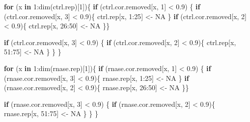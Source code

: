 \documentclass[
]{article}
\newenvironment{Shaded}{\begin{snugshade}}{\end{snugshade}}
\newcommand{\ConstantTok}[1]{\textcolor[rgb]{0.00,0.00,0.00}{#1}}
\newcommand{\ControlFlowTok}[1]{\textcolor[rgb]{0.13,0.29,0.53}{\textbf{#1}}}
\newcommand{\DecValTok}[1]{\textcolor[rgb]{0.00,0.00,0.81}{#1}}
\newcommand{\FloatTok}[1]{\textcolor[rgb]{0.00,0.00,0.81}{#1}}
\newcommand{\FunctionTok}[1]{\textcolor[rgb]{0.00,0.00,0.00}{#1}}
\newcommand{\NormalTok}[1]{#1}
\newcommand{\OtherTok}[1]{\textcolor[rgb]{0.56,0.35,0.01}{#1}}
\newcommand{\SpecialCharTok}[1]{\textcolor[rgb]{0.00,0.00,0.00}{#1}}
\begin{document}
\begin{Shaded}
\begin{Highlighting}[]
\ControlFlowTok{for}\NormalTok{ (x }\ControlFlowTok{in} \DecValTok{1}\SpecialCharTok{:}\FunctionTok{dim}\NormalTok{(ctrl.rep)[}\DecValTok{1}\NormalTok{])\{}
  \ControlFlowTok{if}\NormalTok{ (ctrl.cor.removed[x, }\DecValTok{1}\NormalTok{] }\SpecialCharTok{\textless{}} \FloatTok{0.9}\NormalTok{) \{}
    \ControlFlowTok{if}\NormalTok{ (ctrl.cor.removed[x, }\DecValTok{3}\NormalTok{] }\SpecialCharTok{\textless{}} \FloatTok{0.9}\NormalTok{)\{}
\NormalTok{      ctrl.rep[x, }\DecValTok{1}\SpecialCharTok{:}\DecValTok{25}\NormalTok{] }\OtherTok{\textless{}{-}} \ConstantTok{NA} 
\NormalTok{    \}}
    \ControlFlowTok{if}\NormalTok{ (ctrl.cor.removed[x, }\DecValTok{2}\NormalTok{] }\SpecialCharTok{\textless{}} \FloatTok{0.9}\NormalTok{)\{}
\NormalTok{      ctrl.rep[x, }\DecValTok{26}\SpecialCharTok{:}\DecValTok{50}\NormalTok{] }\OtherTok{\textless{}{-}} \ConstantTok{NA}
\NormalTok{    \}\}}
  
  \ControlFlowTok{if}\NormalTok{ (ctrl.cor.removed[x, }\DecValTok{3}\NormalTok{] }\SpecialCharTok{\textless{}} \FloatTok{0.9}\NormalTok{) \{}
    \ControlFlowTok{if}\NormalTok{ (ctrl.cor.removed[x, }\DecValTok{2}\NormalTok{] }\SpecialCharTok{\textless{}} \FloatTok{0.9}\NormalTok{)\{}
\NormalTok{      ctrl.rep[x, }\DecValTok{51}\SpecialCharTok{:}\DecValTok{75}\NormalTok{] }\OtherTok{\textless{}{-}} \ConstantTok{NA}
\NormalTok{    \}}
\NormalTok{  \}}
\NormalTok{     \}}

\ControlFlowTok{for}\NormalTok{ (x }\ControlFlowTok{in} \DecValTok{1}\SpecialCharTok{:}\FunctionTok{dim}\NormalTok{(rnase.rep)[}\DecValTok{1}\NormalTok{])\{}
  \ControlFlowTok{if}\NormalTok{ (rnase.cor.removed[x, }\DecValTok{1}\NormalTok{] }\SpecialCharTok{\textless{}} \FloatTok{0.9}\NormalTok{) \{}
    \ControlFlowTok{if}\NormalTok{ (rnase.cor.removed[x, }\DecValTok{3}\NormalTok{] }\SpecialCharTok{\textless{}} \FloatTok{0.9}\NormalTok{)\{}
\NormalTok{      rnase.rep[x, }\DecValTok{1}\SpecialCharTok{:}\DecValTok{25}\NormalTok{] }\OtherTok{\textless{}{-}} \ConstantTok{NA} 
\NormalTok{    \}}
    \ControlFlowTok{if}\NormalTok{ (rnase.cor.removed[x, }\DecValTok{2}\NormalTok{] }\SpecialCharTok{\textless{}} \FloatTok{0.9}\NormalTok{)\{}
\NormalTok{      rnase.rep[x, }\DecValTok{26}\SpecialCharTok{:}\DecValTok{50}\NormalTok{] }\OtherTok{\textless{}{-}} \ConstantTok{NA}
\NormalTok{    \}\}}
  
  \ControlFlowTok{if}\NormalTok{ (rnase.cor.removed[x, }\DecValTok{3}\NormalTok{] }\SpecialCharTok{\textless{}} \FloatTok{0.9}\NormalTok{) \{}
    \ControlFlowTok{if}\NormalTok{ (rnase.cor.removed[x, }\DecValTok{2}\NormalTok{] }\SpecialCharTok{\textless{}} \FloatTok{0.9}\NormalTok{)\{}
\NormalTok{      rnase.rep[x, }\DecValTok{51}\SpecialCharTok{:}\DecValTok{75}\NormalTok{] }\OtherTok{\textless{}{-}} \ConstantTok{NA}
\NormalTok{    \}}
\NormalTok{  \}}
\NormalTok{\}}


\end{Highlighting}
\end{Shaded}
\end{document}
